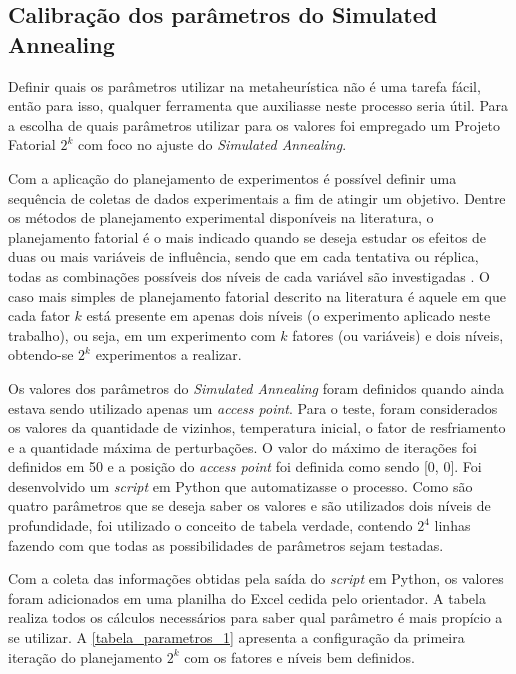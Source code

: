 \documentclass[
	12pt,				%
	twoside,			%
	a4paper,			%
	english,			%
	french,				%
	spanish,			%
	brazil				%
	]{abntex2}
\begin{document}
\subsection{Calibração dos parâmetros do Simulated
Annealing}\label{calibrauxe7uxe3o-dos-paruxe2metros-do-simulated-annealing}

Definir quais os parâmetros utilizar na metaheurística não é uma tarefa
fácil, então para isso, qualquer ferramenta que auxiliasse neste
processo seria útil. Para a escolha de quais parâmetros utilizar para os
valores foi empregado um Projeto Fatorial \(2^{k}\) com foco no ajuste
do \emph{Simulated Annealing}.

Com a aplicação do planejamento de experimentos é possível definir uma
sequência de coletas de dados experimentais a fim de atingir um
objetivo. Dentre os métodos de planejamento experimental disponíveis na
literatura, o planejamento fatorial é o mais indicado quando se deseja
estudar os efeitos de duas ou mais variáveis de influência, sendo que em
cada tentativa ou réplica, todas as combinações possíveis dos níveis de
cada variável são investigadas \cite{NETO}. O caso mais simples de
planejamento fatorial descrito na literatura é aquele em que cada fator
\(k\) está presente em apenas dois níveis (o experimento aplicado neste
trabalho), ou seja, em um experimento com \(k\) fatores (ou variáveis) e
dois níveis, obtendo-se \(2^{k}\) experimentos a realizar.

Os valores dos parâmetros do \emph{Simulated Annealing} foram definidos
quando ainda estava sendo utilizado apenas um \emph{access point}. Para
o teste, foram considerados os valores da quantidade de vizinhos,
temperatura inicial, o fator de resfriamento e a quantidade máxima de
perturbações. O valor do máximo de iterações foi definidos em 50 e a
posição do \emph{access point} foi definida como sendo {[}0, 0{]}. Foi
desenvolvido um \emph{script} em Python que automatizasse o processo.
Como são quatro parâmetros que se deseja saber os valores e são
utilizados dois níveis de profundidade, foi utilizado o conceito de
tabela verdade, contendo \(2^{4}\) linhas fazendo com que todas as
possibilidades de parâmetros sejam testadas.

Com a coleta das informações obtidas pela saída do \emph{script} em
Python, os valores foram adicionados em uma planilha do Excel cedida
pelo orientador. A tabela realiza todos os cálculos necessários para
saber qual parâmetro é mais propício a se utilizar. A
\autoref{tabela_parametros_1} apresenta a configuração da primeira
iteração do planejamento \(2^{k}\) com os fatores e níveis bem
definidos.
\end{document}
